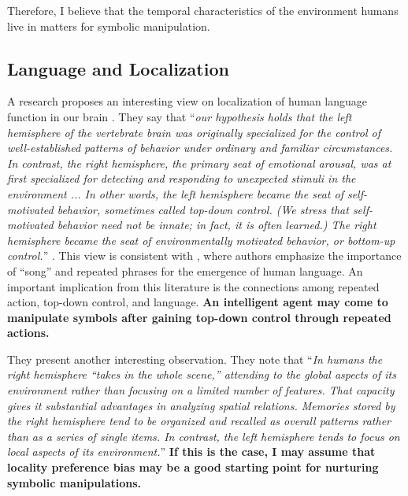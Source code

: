 \documentclass[12pt]{article}
\begin{document}
Therefore, I believe that the temporal characteristics of the environment humans live in matters 
for symbolic manipulation.

\subsection{Language and Localization}
A research proposes an interesting view on localization of human language function in our brain \cite{Macneilage09}. 
They say that ``\textit{our hypothesis holds that the left
hemisphere of the vertebrate brain was originally specialized for the control of well-established
patterns of behavior under ordinary and familiar circumstances. In contrast, the right hemisphere, 
the primary seat of emotional arousal, was at first specialized for detecting and responding to 
unexpected stimuli in the environment ...  In other words, the left hemisphere became the seat of self-motivated behavior, sometimes called top-down control. (We
stress that self-motivated behavior need not be
innate; in fact, it is often learned.) The right
hemisphere became the seat of environmentally
motivated behavior, or bottom-up control.}'' \cite{Macneilage09}. 
This view is consistent with 
\cite{Okanoya07}, where authors emphasize the importance of ``song'' and repeated phrases for 
the emergence of human language. An important implication from this literature is the 
connections among repeated action, top-down control, and language. 
\textbf{An intelligent agent may come to manipulate symbols after gaining top-down control through 
repeated actions.} 

They present another interesting observation. They note that ``\textit{In humans the right hemisphere
“takes in the whole scene,” attending to the global aspects of its environment 
rather than focusing on a limited number of features. That capacity gives it substantial advantages in analyzing
spatial relations. Memories stored by the right hemisphere tend to be organized and recalled as overall patterns 
rather than as a series of single items. In contrast, the left hemisphere tends to
focus on local aspects of its environment.}'' \textbf{If this is the case, I may assume that 
locality preference bias may be a good starting point for nurturing symbolic manipulations.}
\end{document}
